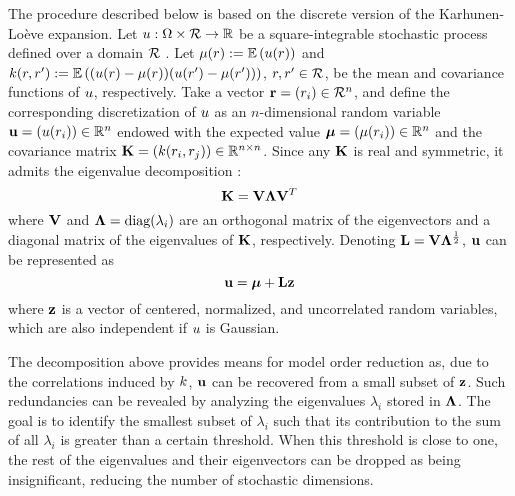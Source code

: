 The procedure described below is based on the discrete version of the Karhunen-Lo\`{e}ve expansion.
Let $u: \Omega \times \mathcal{R} \to \mathbb{R}$ be a square-integrable stochastic process defined over a domain $\mathcal{R}$ \cite{durrett2010}. Let $\fMean{\r} := \E{\u(\r)}$ and $\fCov{\r, \r'} := \E{(\u(\r) - \fMean{\r}) (\u(\r') - \fMean{\r'})}$, $r, r' \in \mathcal{R}$, be the mean and covariance functions of $u$, respectively.
Take a vector $\mathbf{r} = (r_i) \in \mathcal{R}^n$, and define the corresponding discretization of $u$ as an $n$-dimensional random variable $\mathbf{u} = (u(r_i)) \in \mathbb{R}^n$ endowed with the expected value $\vmean = (\fMean{\r_i}) \in \real^n$ and the covariance matrix $\mCov = (\fCov{\r_i, \r_j}) \in \real^{n \times n}$. Since any $\mathbf{K}$ is real and symmetric, it admits the eigenvalue decomposition \cite{press2007}:
\[
  \mathbf{K} = \mathbf{V} \mathbf{\Lambda} \mathbf{V}^T
\]
where $\mathbf{V}$ and $\mathbf{\Lambda} = \text{diag}(\lambda_i)$ are an orthogonal matrix of the eigenvectors and a diagonal matrix of the eigenvalues of $\mathbf{K}$, respectively. Denoting $\mathbf{L} = \mathbf{V} \mathbf{\Lambda}^\frac{1}{2}$, $\mathbf{u}$ can be represented as
\[
  \mathbf{u} = {\boldsymbol\mu} + \mathbf{L} \mathbf{z}
\]
where $\mathbf{z}$ is a vector of centered, normalized, and uncorrelated random variables, which are also independent if $u$ is Gaussian.

The decomposition above provides means for model order reduction as, due to the correlations induced by $\fCov$, $\mathbf{u}$ can be recovered from a small subset of $\mathbf{z}$. Such redundancies can be revealed by analyzing the eigenvalues $\lambda_i$ stored in $\mathbf{\Lambda}$.
The goal is to identify the smallest subset of $\lambda_i$ such that its contribution to the sum of all $\lambda_i$ is greater than a certain threshold.
When this threshold is close to one, the rest of the eigenvalues and their eigenvectors can be dropped as being insignificant, reducing the number of stochastic dimensions.

